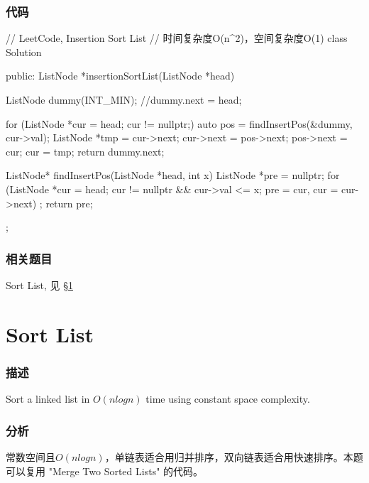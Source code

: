 \subsubsection{代码}
\begin{Code}
	// LeetCode, Insertion Sort List
	// 时间复杂度O(n^2)，空间复杂度O(1)
	class Solution {
		public:
		ListNode *insertionSortList(ListNode *head) {
			ListNode dummy(INT_MIN);
			//dummy.next = head;
			
			for (ListNode *cur = head; cur != nullptr;) {
				auto pos = findInsertPos(&dummy, cur->val);
				ListNode *tmp = cur->next;
				cur->next = pos->next;
				pos->next = cur;
				cur = tmp;
			}
			return dummy.next;
		}
		
		ListNode* findInsertPos(ListNode *head, int x) {
			ListNode *pre = nullptr;
			for (ListNode *cur = head; cur != nullptr && cur->val <= x;
			pre = cur, cur = cur->next)
			;
			return pre;
		}
	};
\end{Code}


\subsubsection{相关题目}
\begindot
\item Sort List, 见 \S \ref{sec:Sort-List}
\myenddot


\section{Sort List} %
\label{sec:Sort-List}


\subsubsection{描述}
Sort a linked list in $O(n log n)$ time using constant space complexity.


\subsubsection{分析}
常数空间且$O(nlogn)$，单链表适合用归并排序，双向链表适合用快速排序。本题可以复用 "Merge Two Sorted Lists" 的代码。


